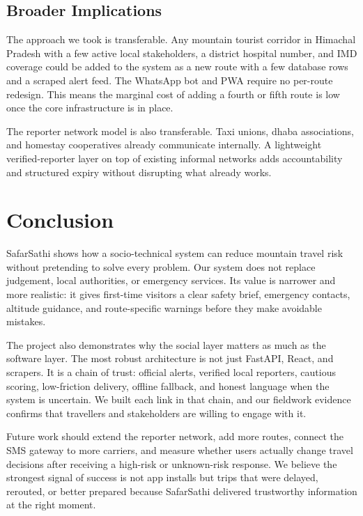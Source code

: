 \documentclass[12pt,a4paper]{article}
\begin{document}
\subsection{Broader Implications}

The approach we took is transferable. Any mountain tourist corridor in Himachal Pradesh with a few active local stakeholders, a district hospital number, and IMD coverage could be added to the system as a new route with a few database rows and a scraped alert feed. The WhatsApp bot and PWA require no per-route redesign. This means the marginal cost of adding a fourth or fifth route is low once the core infrastructure is in place.

The reporter network model is also transferable. Taxi unions, dhaba associations, and homestay cooperatives already communicate internally. A lightweight verified-reporter layer on top of existing informal networks adds accountability and structured expiry without disrupting what already works.

\section{Conclusion}

SafarSathi shows how a socio-technical system can reduce mountain travel risk without pretending to solve every problem. Our system does not replace judgement, local authorities, or emergency services. Its value is narrower and more realistic: it gives first-time visitors a clear safety brief, emergency contacts, altitude guidance, and route-specific warnings before they make avoidable mistakes.

The project also demonstrates why the social layer matters as much as the software layer. The most robust architecture is not just FastAPI, React, and scrapers. It is a chain of trust: official alerts, verified local reporters, cautious scoring, low-friction delivery, offline fallback, and honest language when the system is uncertain. We built each link in that chain, and our fieldwork evidence confirms that travellers and stakeholders are willing to engage with it.

Future work should extend the reporter network, add more routes, connect the SMS gateway to more carriers, and measure whether users actually change travel decisions after receiving a high-risk or unknown-risk response. We believe the strongest signal of success is not app installs but trips that were delayed, rerouted, or better prepared because SafarSathi delivered trustworthy information at the right moment.
\end{document}
